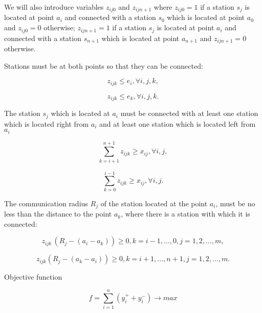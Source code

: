	We will also introduce variables $z_{ij0}$ and $z_{ijn+1}$ where $z_{ij0}=1$ if a station $s_j$ is located at point $a_i$ and connected with a station $s_0$ which is located at point  $a_0$  and $z_{ij0} = 0$ otherwise; $z_{ijn+1}=1$ if a station $s_j$ is located at point $a_i$ and connected with a station $s_{n+1}$ which is located at point $a_{n+1}$  and $z_{ijn+1} = 0$ otherwise.

Stations must be at both points so that they can be connected: 

\begin{displaymath}
z_{ijk}\le e_i,  \forall i,j,k,
\end{displaymath}

\begin{displaymath}
z_{ijk}\le e_k, \forall i,j,k.
\end{displaymath}

The station $s_j$ which is located at $a_i$ must be connected with at least one station which is located right from $a_i$ and at least one station  which is located left from $a_i$

\begin{displaymath}
\sum_{k=i+1}^{n+1}{z_{ijk} \geq x_{ij}}, \forall i,j,
\end{displaymath}

\begin{displaymath}
\sum_{k=0}^{i-1}{z_{ijk} \geq x_{ij}}, \forall i,j.
\end{displaymath}

The communication radius $R_j$ of the station located at the point  $a_i$, must be no less than the distance to the point $a_k$, where there is a station with which it is connected:

\begin{displaymath}
z_{ijk\ }\left(R_j-\left(a_i-a_k\right)\right)\geq 0, k=i-1,\ldots,0, j=1,2,\ldots,m,  
\end{displaymath}

\begin{displaymath}
z_{ijk}\left(R_j-\left(a_k-a_i\right)\right)\geq 0, k=i+1,\ldots,n+1, j=1,2,\ldots,m. 
\end{displaymath}

Objective function

\begin{displaymath}
f=\sum_{i=1}^{n}{\left(y_i^++y_i^-\right)\rightarrow max} 
\end{displaymath}


